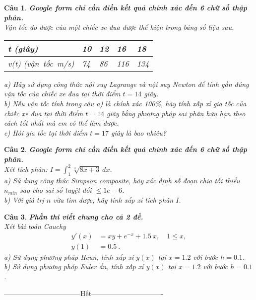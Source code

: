\documentclass[11pt]{article}
\newtheorem{bt}{Câu}
\begin{document}
\begin{bt} \textbf{Google form chỉ cần điền kết quả chính xác đến 6 chữ số thập phân.} \\
Vận tốc đo được của một chiếc xe đua được thể hiện trong bảng số liệu sau. 
\begin{center}
	\begin{tabular}[5]{l|l|l|l|l}
		t \mbox{(giây)}   & 10 & 12 & 16 & 18 \\ \hline
		v(t) \mbox{(vận tốc m/s)} & 74 & 86 & 116 & 134
	\end{tabular}	
\end{center}
% 
a) Hãy sử dụng công thức nội suy Lagrange và nội suy Newton để tính gần đúng vận tốc của chiếc xe đua tại thời điểm $t = 14$ giây.\\
b) Nếu vận tốc tính trong câu a) là chính xác 100\%, hãy tính xấp xỉ gia tốc của chiếc xe đua tại thời điểm $t = 14$ giây bằng phương pháp sai phân hữu hạn theo cách tốt nhất mà em có thể làm được. \\
c) Hỏi gia tốc tại thời điểm $t = 17$ giây là bao nhiêu?	
\end{bt}

\begin{bt} \textbf{Google form chỉ cần điền kết quả chính xác đến 6 chữ số thập phân.} \\ 
Xét tích phân: $I = \int_{1}^{2} \sqrt[3]{8x+3} \ dx$. \\
a) Sử dụng công thức Simpson composite, hãy xác định số đoạn chia tối thiểu $n_{min}$ sao cho sai số tuyệt đối $\leq 1e-6$. \\
b) Với giá trị $n$ vừa tìm được, hãy tính xấp xỉ tích phân $I$.
\end{bt}

\begin{bt} \textbf{Phần thi viết chung cho cả 2 đề.} \\ 
Xét bài toán Cauchy  
\begin{align}
	y'(x) &= xy + e^{-x} + 1.5 \ x, \quad 1 \leq x, \\
	y(1)  &= 0.5 \ . 
\end{align}
%
a) Sử dụng phương pháp Heun, tính xấp xỉ $y(x)$ tại $x=1.2$ với bước $h = 0.1$. \\
b) Sử dụng phương pháp Euler ẩn, tính xấp xỉ $y(x)$ tại $x=1.2$ với bước $h = 0.1$. \\
\end{bt}

\centerline{———————————Hết——————————-}
\end{document}
